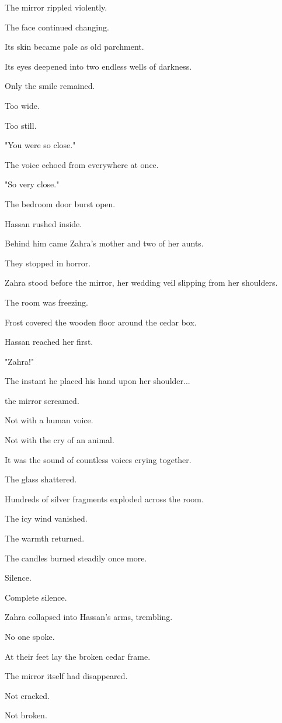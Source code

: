 \documentclass[12pt,openany]{book}
\begin{document}
The mirror rippled violently.

The face continued changing.

Its skin became pale as old parchment.

Its eyes deepened into two endless wells of darkness.

Only the smile remained.

Too wide.

Too still.

"You were so close."

The voice echoed from everywhere at once.

"So very close."

The bedroom door burst open.

Hassan rushed inside.

Behind him came Zahra's mother and two of her aunts.

They stopped in horror.

Zahra stood before the mirror, her wedding veil slipping from her shoulders.

The room was freezing.

Frost covered the wooden floor around the cedar box.

Hassan reached her first.

"Zahra!"

The instant he placed his hand upon her shoulder...

the mirror screamed.

Not with a human voice.

Not with the cry of an animal.

It was the sound of countless voices crying together.

The glass shattered.

Hundreds of silver fragments exploded across the room.

The icy wind vanished.

The warmth returned.

The candles burned steadily once more.

Silence.

Complete silence.

Zahra collapsed into Hassan's arms, trembling.

No one spoke.

At their feet lay the broken cedar frame.

The mirror itself had disappeared.

Not cracked.

Not broken.
\end{document}
